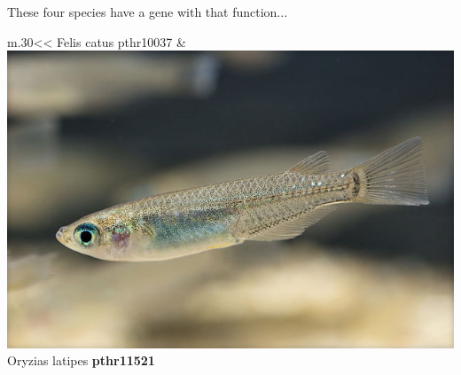 \documentclass[aspectratio=169, 9pt]{beamer}
\begin{document}
\begin{frame}[t]

These four species have a gene with that function... 

\vfill

\def\tmpwidth{.30\linewidth}
\begin{table}
\footnotesize
\begin{tabular}{*{2}{m{\tmpwidth}<\centering}}
   \linebreak Felis catus pthr10037 & %
\includegraphics[width=1\linewidth]{Oryzias_latipes.jpg} \linebreak Oryzias latipes \textbf{pthr11521} \\ %

\end{tabular}
\end{table}
\end{frame}
\end{document}
